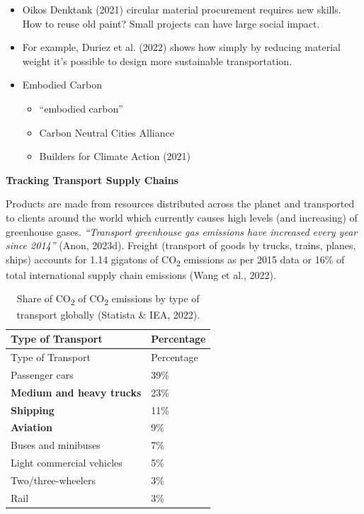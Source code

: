 \documentclass[
  letterpaper,
  DIV=11,
  numbers=noendperiod]{scrartcl}
\providecommand{\tightlist}{%
  \setlength{\itemsep}{0pt}\setlength{\parskip}{0pt}}\usepackage{longtable,booktabs,array}
\begin{document}
\begin{itemize}
\tightlist
\item
  Oikos Denktank (2021) circular material procurement requires new
  skills. How to reuse old paint? Small projects can have large social
  impact.
\item
  For example, Duriez et al. (2022) shows how simply by reducing
  material weight it's possible to design more sustainable
  transportation.
\item
  Embodied Carbon

  \begin{itemize}
  \tightlist
  \item
    ``embodied carbon''
  \item
    Carbon Neutral Cities Alliance
  \item
    Builders for Climate Action (2021)
  \end{itemize}
\end{itemize}

\textbf{Tracking Transport Supply Chains}

Products are made from resources distributed across the planet and
transported to clients around the world which currently causes high
levels (and increasing) of greenhouse gases. \emph{``Transport
greenhouse gas emissions have increased every year since 2014''} (Anon,
2023d). Freight (transport of goods by trucks, trains, planes, ships)
accounts for 1.14 gigatons of CO\textsubscript{2} emissions as per 2015
data or 16\% of total international supply chain emissions (Wang et al.,
2022).

\begin{longtable}[]{@{}ll@{}}
\caption{Share of CO\textsubscript{2} of CO\textsubscript{2} emissions
by type of transport globally (Statista \& IEA, 2022).}\tabularnewline
\toprule\noalign{}
Type of Transport & Percentage \\
\midrule\noalign{}
\endfirsthead
\toprule\noalign{}
Type of Transport & Percentage \\
\midrule\noalign{}
\endhead
\bottomrule\noalign{}
\endlastfoot
Passenger cars & 39\% \\
\textbf{Medium and heavy trucks} & 23\% \\
\textbf{Shipping} & 11\% \\
\textbf{Aviation} & 9\% \\
Buses and minibuses & 7\% \\
Light commercial vehicles & 5\% \\
Two/three-wheelers & 3\% \\
Rail & 3\% \\
\end{longtable}
\end{document}
